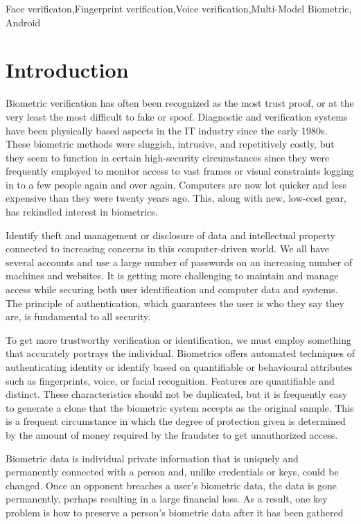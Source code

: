 \documentclass[conference]{IEEEtran}
\begin{document}
\begin{IEEEkeywords}
Face verificaton,Fingerprint verification,Voice verification,Multi-Model Biometric, Android
\end{IEEEkeywords}

\section{Introduction}
Biometric verification has often been recognized as the most trust proof, or at the very least the most difficult to fake or spoof. Diagnostic and verification systems have been physically based aspects in the IT industry since the early 1980s. These biometric methods were sluggish, intrusive, and repetitively costly, but they seem to function in certain high-security circumstances since they were frequently employed to monitor access to vast frames or visual constraints logging in to a few people again and over again. Computers are now lot quicker and less expensive than they were twenty years ago. This, along with new, low-cost gear, has rekindled interest in biometrics.

Identify theft and management or disclosure of data and intellectual property connected to increasing concerns in this computer-driven world. We all have several accounts and use a large number of passwords on an increasing number of machines and websites. It is getting more challenging to maintain and manage access while securing both user identification and computer data and systems. The principle of authentication, which guarantees the user is who they say they are, is fundamental to all security.

To get more trustworthy verification or identification, we must employ something that accurately portrays the individual. Biometrics offers automated techniques of authenticating identity or identify based on quantifiable or behavioural attributes such as fingerprints, voice, or facial recognition. Features are quantifiable and distinct. These characteristics should not be duplicated, but it is frequently easy to generate a clone that the biometric system accepts as the original sample. This is a frequent circumstance in which the degree of protection given is determined by the amount of money required by the fraudster to get unauthorized access.

Biometric data is individual private information that is uniquely and permanently connected with a person and, unlike credentials or keys, could be changed. Once an opponent breaches a user's biometric data, the data is gone permanently, perhaps resulting in a large financial loss. As a result, one key problem is how to preserve a person's biometric data after it has been gathered
\end{document}
